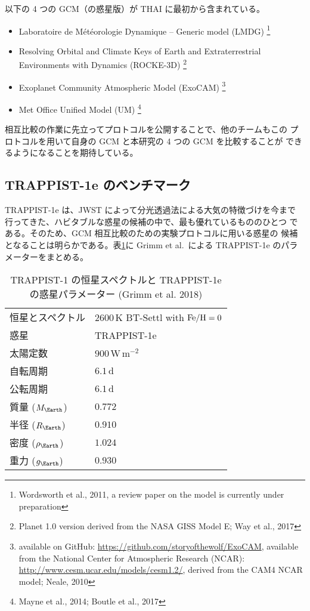 \documentclass{dennou777}
\newcommand{\hmunit}[1]{\,\mathrm{#1}}
\begin{document}
以下の 4 つの GCM（の惑星版）が THAI に最初から含まれている。
\begin{itemize}
	\item Laboratoire de Météorologie Dynamique -- Generic model (LMDG)%
		\footnote{Wordsworth et al., 2011, a review paper on the model
		is currently under preparation}
	\item Resolving Orbital and Climate Keys of Earth and
		Extraterrestrial Environments with Dynamics (ROCKE-3D)%
		\footnote{Planet 1.0 version derived from the NASA GISS Model E;
		Way et al., 2017}
	\item Exoplanet Community Atmospheric Model (ExoCAM)
		\footnote{available on GitHub:
		\url{https://github.com/storyofthewolf/ExoCAM},
		available from the National Center for Atmospheric Research (NCAR):
		\url{http://www.cesm.ucar.edu/models/cesm1.2/},
		derived from the CAM4 NCAR model; Neale, 2010}
	\item Met Office Unified Model (UM)
		\footnote{Mayne et al., 2014; Boutle et al., 2017}
\end{itemize}

相互比較の作業に先立ってプロトコルを公開することで、他のチームもこの
プロトコルを用いて自身の GCM と本研究の 4 つの GCM を比較することが
できるようになることを期待している。

\subsection{TRAPPIST-1e のベンチマーク}\label{benchmark}

TRAPPIST-1e は、JWST によって分光透過法による大気の特徴づけを今まで
行ってきた、ハビタブルな惑星の候補の中で、最も優れているもののひとつ
である。そのため、GCM 相互比較のための実験プロトコルに用いる惑星の
候補となることは明らかである。表\ref{param}に Grimm et al.\ による
TRAPPIST-1e のパラメーターをまとめる。

\begin{table}[t]
	\caption{TRAPPIST-1 の恒星スペクトルと TRAPPIST-1e の惑星パラメーター
	(Grimm et al. 2018)}\label{param}
	\centering
	\begin{tabular}{ll}
		\hline
		恒星とスペクトル&\(2600\hmunit{K}\) BT-Settl with \(\ce{Fe/H}=0\)\\
		惑星&TRAPPIST-1e\\
		太陽定数&\(900\hmunit{W\,m^{-2}}\)\\
		自転周期&\(6.1\hmunit{d}\)\\
		公転周期&\(6.1\hmunit{d}\)\\
		質量 (\(M_\Earth\))&\(0.772\)\\
		半径 (\(R_\Earth\))&\(0.910\)\\
		密度 (\(\rho_\Earth\))&\(1.024\)\\
		重力 (\(g_\Earth\))&\(0.930\)\\
		\hline
	\end{tabular}
\end{table}
\end{document}

